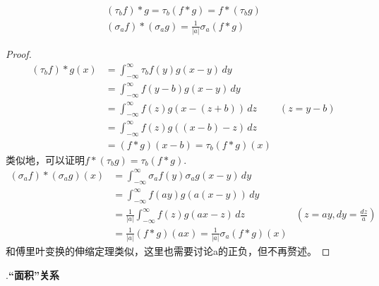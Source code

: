 \documentclass{ctexbook}
\begin{document}
\begin{proposition}
    \begin{align*}
    (\tau_b f)*g=\tau_b (f*g)=f*(\tau_b g) \\
    (\sigma_a f)*(\sigma_a g)=\frac{1}{|a|}\sigma_a(f*g)
\end{align*}
\end{proposition}
\begin{proof}
    \begin{align*}
    (\tau_b f)*g(x) & =\int_{-\infty}^{\infty}\tau_b f(y)g(x-y)\,dy           \\
                    & =\int_{-\infty}^{\infty}f(y-b)g(x-y)\,dy                \\
                    & =\int_{-\infty}^{\infty}f(z)g(x-(z+b))\,dz    & (z=y-b) \\
                    & =\int_{-\infty}^{\infty}f(z)g((x-b)-z)\,dz              \\
                    & =(f*g)(x-b)=\tau_b (f*g)(x)
\end{align*}
类似地，可以证明$f*(\tau_b g)=\tau_b (f*g)$.
\begin{align*}
    (\sigma_a f)*(\sigma_a g)(x) & =\int_{-\infty}^{\infty}\sigma_a f(y)\sigma_a g(x-y)\,dy                          \\
                                 & =\int_{-\infty}^{\infty}f(ay)g(a(x-y))\,dy                                        \\
                                 & =\frac{1}{|a|}\int_{-\infty}^{\infty}f(z)g(a x - z)\,dz  & \left(z=ay,dy=\frac{dz}{a}\right) \\
                                 & =\frac{1}{|a|}(f*g)(a x)=\frac{1}{|a|}\sigma_a(f*g)(x)
\end{align*}
和傅里叶变换的伸缩定理类似，这里也需要讨论a的正负，但不再赘述。
\end{proof}

.\textbf{“面积”关系}
\end{document}
